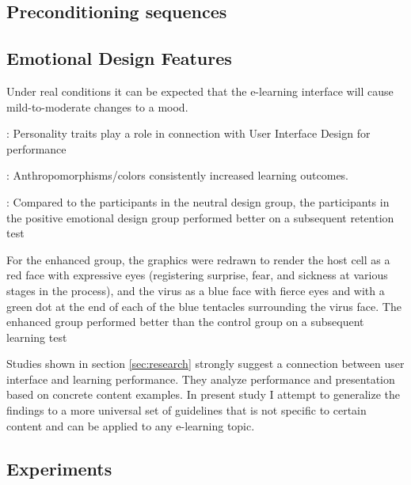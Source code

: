 	\subsection{Preconditioning sequences} \label{sec:preconditioning}
	
	
	
	\subsection{Emotional Design Features} \label{sec:emotional-design-features}

Under real conditions it can be expected that the e-learning interface will cause mild-to-moderate changes to a mood.
	
	
	\cite{Arockiam2013}: Personality traits play a role in connection with User Interface Design for performance
	
	\cite{Brom2018}: Anthropomorphisms/colors consistently increased learning outcomes.
	
	\cite{Le2018}: Compared to the participants in the neutral design group, the participants in the positive emotional design group performed better on a subsequent retention test
	
	\cite{Mayer2014} For the enhanced group, the graphics were redrawn to render the host cell as a red face with expressive eyes (registering surprise, fear, and sickness at various stages in the process), and the virus as a blue face with fierce eyes and with a green dot at the end of each of the blue tentacles surrounding the virus face. The enhanced group performed better than the control group on a subsequent learning test
	
	Studies shown in section \ref{sec:research} strongly suggest a connection between user interface and learning performance. They analyze performance and presentation based on concrete content examples. In present study I attempt to generalize the findings to a more universal set of guidelines that is not specific to certain content and can be applied to any e-learning topic.
	
	
	
	\subsection{Experiments}

